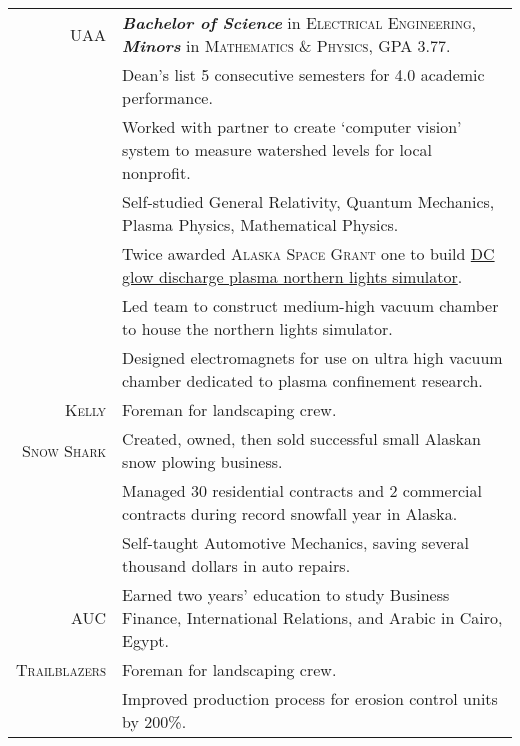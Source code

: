 \documentclass[letter,11pt]{article}
\begin{document}
\begin{center}
{\begin{tabular}{r|l}
\addlinespace[8pt]
		
		\textsc{UAA}
	&	\footnotesize{\textit{\textbf{Bachelor of Science}} in \textsc{Electrical Engineering}, \textit{\textbf{Minors}} in \textsc{Mathematics \& Physics}, GPA 3.77.}
	\\
		\rule{0pt}{8pt}
	&	\scriptsize{Dean's list 5 consecutive semesters for 4.0 academic performance.}
	\\
		\rule{0pt}{8pt}
	&	\scriptsize{Worked with partner to create `computer vision' system to measure watershed levels for local nonprofit.}
	\\
		\rule{0pt}{8pt}
	&	\scriptsize{Self-studied General Relativity, Quantum Mechanics, Plasma Physics, Mathematical Physics.}
	\\
		\rule{0pt}{8pt}
	&	\scriptsize{Twice awarded \textsc{Alaska Space Grant} one to build \href{https://github.com/blairmunroakusa/portfolio.worksamples/tree/master/planeterrella}{DC glow discharge plasma northern lights simulator}.}
	\\
		\rule{0pt}{8pt}
	&	\scriptsize{Led team to construct medium-high vacuum chamber to house the northern lights simulator.}
	\\
		\rule{0pt}{8pt}
	&	\scriptsize{Designed electromagnets for use on ultra high vacuum chamber dedicated to plasma confinement research.}
	\\

\addlinespace[8pt]

		\textsc{Kelly}
	&	\scriptsize{Foreman for landscaping crew.}
	\\

\addlinespace[8pt]

		\textsc{Snow Shark}
	&	\scriptsize{Created, owned, then sold successful small Alaskan snow plowing business.}
	\\
		\rule{0pt}{8pt}
	&	\scriptsize{Managed 30 residential contracts and 2 commercial contracts during record snowfall year in Alaska.}
	\\
		\rule{0pt}{8pt}
	&	\scriptsize{Self-taught Automotive Mechanics, saving several thousand dollars in auto repairs.}
	\\

\addlinespace[8pt]

		\textsc{AUC}
	&	\scriptsize{Earned two years' education to study Business Finance, International Relations, and Arabic in Cairo, Egypt.}
	\\

\addlinespace[8pt]

		\textsc{Trailblazers}
	&	\scriptsize{Foreman for landscaping crew.}
	\\
		\rule{0pt}{8pt}
	&	\scriptsize{Improved production process for erosion control units by 200\%.}
	\\


\end{tabular}}
\end{center}
\end{document}
